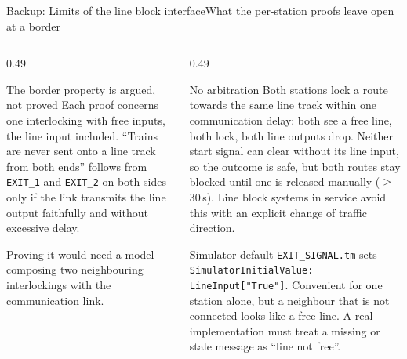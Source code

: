 \documentclass[aspectratio=169,10pt]{beamer}
\newcommand{\bodyfont}{\fontsize{7.8}{9.6}\selectfont}
\begin{document}
\begin{frame}{Backup: Limits of the line block interface}{What the per-station proofs leave open at a border}
  \begin{columns}[T]
    \begin{column}{0.49\textwidth}
      \begin{proverbox}{The border property is argued, not proved}
        \bodyfont
        Each proof concerns one interlocking with free inputs, the line input included. ``Trains are never sent onto a line track from both ends'' follows from \texttt{EXIT\_1} and \texttt{EXIT\_2} on both sides only if the link transmits the line output faithfully and without excessive delay.\par
        \vspace{1mm}
        Proving it would need a model composing two neighbouring interlockings with the communication link.
      \end{proverbox}
    \end{column}
    \begin{column}{0.49\textwidth}
      \begin{alertbox}{No arbitration}
        \bodyfont
        Both stations lock a route towards the same line track within one communication delay: both see a free line, both lock, both line outputs drop. Neither start signal can clear without its line input, so the outcome is safe, but both routes stay blocked until one is released manually ($\geq$\,30\,s). Line block systems in service avoid this with an explicit change of traffic direction.
      \end{alertbox}
      \vspace{-1mm}
      \begin{proverbox}{Simulator default}
        \bodyfont
        \texttt{EXIT\_SIGNAL.tm} sets \texttt{SimulatorInitialValue: LineInput["True"]}. Convenient for one station alone, but a neighbour that is not connected looks like a free line. A real implementation must treat a missing or stale message as ``line not free''.
      \end{proverbox}
    \end{column}
  \end{columns}
\end{frame}
\end{document}
